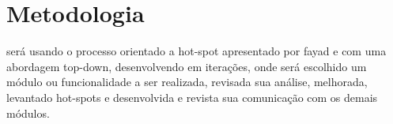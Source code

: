 \chapter[Metodologia]{Metodologia}
será usando o processo orientado a hot-spot apresentado por fayad e com uma abordagem top-down, desenvolvendo em iterações, onde será escolhido um módulo ou funcionalidade a ser realizada, revisada sua análise, melhorada, levantado hot-spots e desenvolvida e revista sua comunicação com os demais módulos.